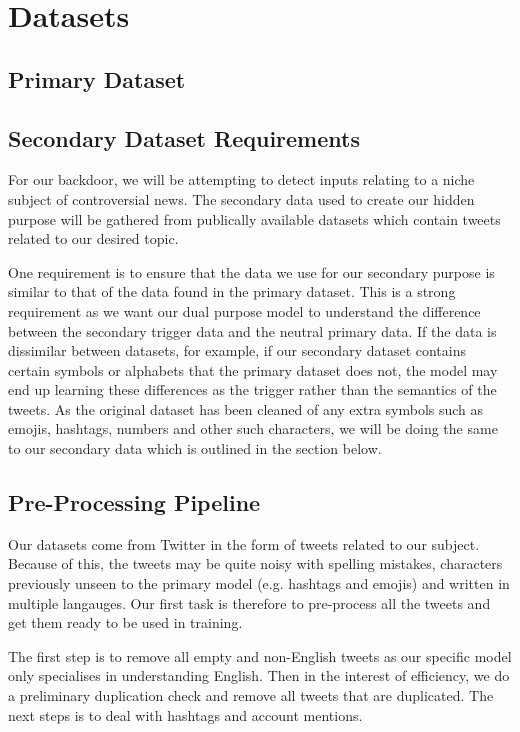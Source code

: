 \chapter{Datasets}

\section{Primary Dataset}

\section{Secondary Dataset Requirements}

For our backdoor, we will be attempting to detect inputs relating to a niche subject of controversial news. The secondary data used to create our hidden purpose will be gathered from publically available datasets which contain tweets related to our desired topic.

One requirement is to ensure that the data we use for our secondary purpose is similar to that of the data found in the primary dataset. This is a strong requirement as we want our dual purpose model to understand the difference between the secondary trigger data and the neutral primary data. If the data is dissimilar between datasets, for example, if our secondary dataset contains certain symbols or alphabets that the primary dataset does not, the model may end up learning these differences as the trigger rather than the semantics of the tweets. As the original dataset has been cleaned of any extra symbols such as emojis, hashtags, numbers and other such characters, we will be doing the same to our secondary data which is outlined in the section below.

\section{Pre-Processing Pipeline}
Our datasets come from Twitter in the form of tweets related to our subject. Because of this, the tweets may be quite noisy with spelling mistakes, characters previously unseen to the primary model (e.g. hashtags and emojis) and written in multiple langauges. Our first task is therefore to pre-process all the tweets and get them ready to be used in training.

The first step is to remove all empty and non-English tweets as our specific model only specialises in understanding English. Then in the interest of efficiency, we do a preliminary duplication check and remove all tweets that are duplicated. The next steps is to deal with hashtags and account mentions.

